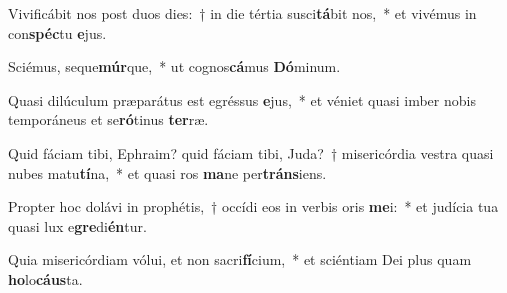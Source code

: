 \item Vivificábit nos post duos dies:~† in die tértia susci\textbf{tá}bit nos,~* et vivémus in con\textbf{spéc}tu \textbf{e}jus.
\item Sciémus, seque\textbf{múr}que,~* ut cognos\textbf{cá}mus \textbf{Dó}minum.
\item Quasi dilúculum præparátus est egréssus \textbf{e}jus,~* et véniet quasi imber nobis temporáneus et se\textbf{ró}tinus \textbf{ter}ræ.
\item Quid fáciam tibi, Ephraim? quid fáciam tibi, Juda?~† misericórdia vestra quasi nubes matu\textbf{tí}na,~* et quasi ros \textbf{ma}ne per\textbf{tráns}iens.
\item Propter hoc dolávi in prophétis,~† occídi eos in verbis oris \textbf{me}i:~* et judícia tua quasi lux e\textbf{gre}di\textbf{én}tur.
\item Quia misericórdiam vólui, et non sacri\textbf{fí}cium,~* et sciéntiam Dei plus quam \textbf{ho}lo\textbf{cáus}ta.
